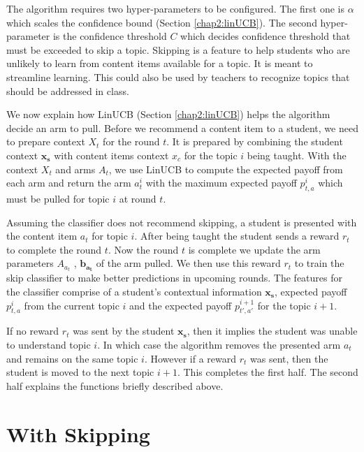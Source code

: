 The algorithm requires two hyper-parameters to be configured. The first one is $\alpha$ which scales the confidence bound (Section \ref{chap2:linUCB}). The second hyper-parameter is the confidence threshold $C$ which decides confidence threshold that must be exceeded to skip a topic. Skipping is a feature to help students who are unlikely to learn from content items available for a topic. It is meant to streamline learning. This could also be used by teachers to recognize topics that should be addressed in class. \par

We now explain how LinUCB (Section \ref{chap2:linUCB}) helps the algorithm decide an arm to pull. Before we recommend a content item to a student, we need to prepare context $X_t$ for the round $t$. It is prepared by combining the student context $\mathbf{x_s}$ with content items context $x_c$ for the topic $i$ being taught. With the context $X_t$ and arms $A_t$, we use LinUCB to compute the expected payoff from each arm and return the arm $a^{i}_t$ with the maximum expected payoff $p^{i}_{t,a}$ which must be pulled for topic $i$ at round $t$. \par 

Assuming the classifier does not recommend skipping, a student is presented with the content item $a_t$ for topic $i$. After being taught the student sends a reward $r_t$ to complete the round $t$. Now the round $t$ is complete we update the arm parameters $A_{a_t}$ , $\mathbf{b_{a_t}}$ of the arm pulled. We then use this reward ${r_t}$ to train the skip classifier to make better predictions in upcoming rounds. The features for the classifier comprise of a student's contextual information $\mathbf{x_s}$, expected payoff $p^{i}_{t,a}$ from the current topic $i$ and the expected payoff $p^{i+1}_{t',a'}$ for the topic $i+1$. \par

If no reward $r_t$ was sent by the student $\mathbf{x_s}$, then it implies the student was unable to understand topic $i$. In which case the algorithm removes the presented arm $a_t$ and remains on the same topic $i$. However if a reward $r_t$ was sent, then the student is moved to the next topic $i+1$. This completes the first half. The second half explains the functions briefly described above. \par

\section{With Skipping \label{chap4:skip}}

